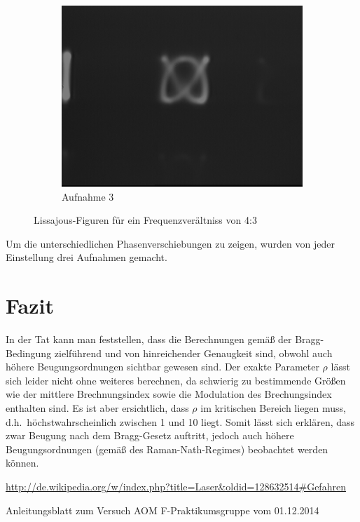 \documentclass[bigchapter,colorback,accentcolor=tud4b,linedtoc,11pt]{tudreport}
\begin{document}
\begin{figure}[H]
\begin{subfigure}[h]{0.32\textwidth}
    \includegraphics[width=\textwidth]{data/Aufgabe7/4-3-y.png}
    \caption[Cap for listoffigures]{Aufnahme 3}
  \end{subfigure}%
  \caption{Lissajous-Figuren für ein Frequenzverältniss von 4:3}
\end{figure}

Um die unterschiedlichen Phasenverschiebungen zu zeigen, wurden von jeder Einstellung drei Aufnahmen gemacht.


\chapter{Fazit}

In der Tat kann man feststellen, dass die Berechnungen gemäß der Bragg-Bedingung zielführend und von hinreichender Genaugkeit sind, obwohl auch höhere Beugungsordnungen sichtbar gewesen sind. Der exakte Parameter $\rho$ lässt sich leider nicht ohne weiteres berechnen, da schwierig zu bestimmende Größen wie der mittlere Brechnungsindex sowie die Modulation des Brechungsindex enthalten sind. Es ist aber ersichtlich, dass $\rho$ im kritischen Bereich liegen muss, d.h.\ höchstwahrscheinlich zwischen 1 und 10 liegt. Somit lässt sich erklären, dass zwar Beugung nach dem Bragg-Gesetz auftritt, jedoch auch höhere Beugungsordnungen (gemäß des Raman-Nath-Regimes) beobachtet werden können.

\cleardoublepage{}
\newpage
\begin{thebibliography}{100}
    \url{http://de.wikipedia.org/w/index.php?title=Laser&oldid=128632514#Gefahren}
   
    Anleitungsblatt zum Versuch
    AOM F-Praktikumsgruppe vom 01.12.2014
\end{thebibliography}
\end{document}
